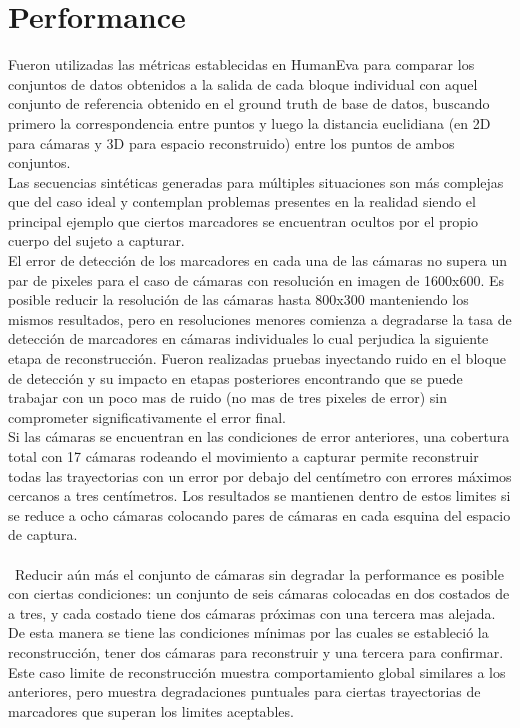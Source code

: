 \section{Performance}

Fueron utilizadas las métricas establecidas en HumanEva \cite{humaneva} para comparar los conjuntos de datos obtenidos a la salida de cada bloque individual con aquel conjunto de referencia obtenido en el ground truth de base de datos, buscando primero la correspondencia entre puntos y luego la distancia euclidiana (en 2D para cámaras y 3D para espacio reconstruido) entre los puntos de ambos conjuntos.
\\

Las secuencias sintéticas generadas para múltiples situaciones son más complejas que del caso ideal y contemplan problemas presentes en la realidad siendo el principal ejemplo que ciertos marcadores se encuentran ocultos por el propio cuerpo del sujeto a capturar. 
\\

El error de detección de los marcadores en cada una de las cámaras no supera un par de pixeles para el caso de cámaras con resolución en imagen de 1600x600. Es posible reducir la resolución de las cámaras hasta 800x300 manteniendo los mismos resultados, pero en resoluciones menores comienza a degradarse la tasa de detección de marcadores en cámaras individuales lo cual perjudica la siguiente etapa de reconstrucción. Fueron realizadas pruebas inyectando ruido en el bloque de detección y su impacto en etapas posteriores encontrando que se puede trabajar con un poco mas de ruido (no mas de tres pixeles de error) sin comprometer significativamente el error final.
\\

Si las cámaras se encuentran en las condiciones de error anteriores, una cobertura total con 17 cámaras rodeando el movimiento a capturar permite reconstruir todas las trayectorias con un error por debajo del centímetro con errores máximos cercanos a tres centímetros. Los resultados se mantienen dentro de estos limites si se reduce a ocho cámaras colocando pares de cámaras en cada esquina del espacio de captura. \\\\\
Reducir aún más el conjunto de cámaras sin degradar la performance es posible con ciertas condiciones: un conjunto de seis cámaras colocadas en dos costados de a tres, y cada costado tiene dos cámaras próximas con una tercera mas alejada. De esta manera se tiene las condiciones mínimas por las cuales se estableció la reconstrucción, tener dos cámaras para reconstruir y una tercera para confirmar.
\\

Este caso limite de reconstrucción muestra comportamiento global similares a los anteriores, pero muestra degradaciones puntuales para ciertas trayectorias de marcadores que superan los limites aceptables.

